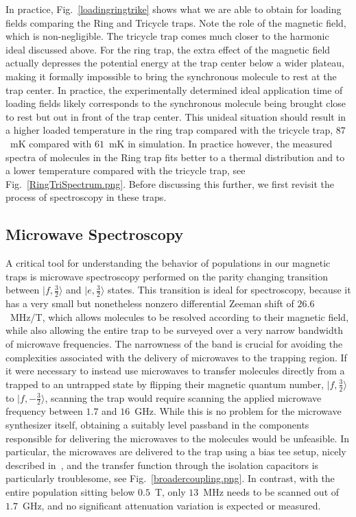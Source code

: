 \documentclass[defaultstyle,11pt]{thesis}
\begin{document}
In practice, Fig.~\ref{loadingringtrike} shows what we are able to obtain for loading fields comparing the Ring and Tricycle traps.
Note the role of the magnetic field, which is non-negligible.
The tricycle trap comes much closer to the harmonic ideal discussed above.
For the ring trap, the extra effect of the magnetic field actually depresses the potential energy at the trap center below a wider plateau, making it formally impossible to bring the synchronous molecule to rest at the trap center.
In practice, the experimentally determined ideal application time of loading fields likely corresponds to the synchronous molecule being brought close to rest but out in front of the trap center.
This unideal situation should result in a higher loaded temperature in the ring trap compared with the tricycle trap, $87$~mK compared with $61$~mK in simulation.
In practice however, the measured spectra of molecules in the Ring trap fits better to a thermal distribution and to a lower temperature compared with the tricycle trap, see Fig.~\ref{RingTriSpectrum.png}.
Before discussing this further, we first revisit the process of spectroscopy in these traps.

\subsection{Microwave Spectroscopy}

A critical tool for understanding the behavior of populations in our magnetic traps is microwave spectroscopy performed on the parity changing transition between $|f, \frac{3}{2}\rangle$ and $|e, \frac{3}{2}\rangle$ states.
This transition is ideal for spectroscopy, because it has a very small but nonetheless nonzero differential Zeeman shift of $26.6$~MHz/T, which allows molecules to be resolved according to their magnetic field, while also allowing the entire trap to be surveyed over a very narrow bandwidth of microwave frequencies.
The narrowness of the band is crucial for avoiding the complexities associated with the delivery of microwaves to the trapping region.
If it were necessary to instead use microwaves to transfer molecules directly from a trapped to an untrapped state by flipping their magnetic quantum number, $|f, \frac{3}{2}\rangle$ to $|f, -\frac{3}{2}\rangle$, scanning the trap would require scanning the applied microwave frequency between $1.7$ and $16$~GHz.
While this is no problem for the microwave synthesizer itself, obtaining a suitably level passband in the components responsible for delivering the microwaves to the molecules would be unfeasible.
In particular, the microwaves are delivered to the trap using a bias tee setup, nicely described in~\citep[Fig.~5]{stuhl2012uwave}, and the transfer function through the isolation capacitors is particularly troublesome, see Fig.~\ref{broadercoupling.png}.
In contrast, with the entire population sitting below $0.5$~T, only $13$~MHz needs to be scanned out of $1.7$~GHz, and no significant attenuation variation is expected or measured.
\end{document}
